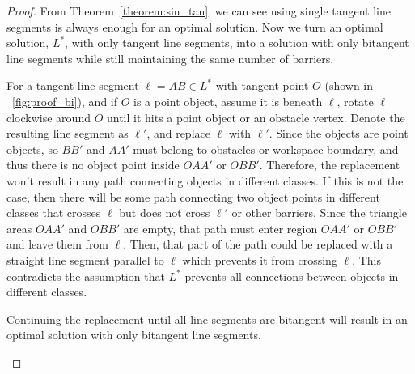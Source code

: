 \begin{proof}
From Theorem~\ref{theorem:sin_tan}, we can see using single tangent line segments is always enough
for an optimal solution. 
Now we turn an optimal solution, $L^*$, with only tangent line segments, into
a solution with only bitangent line segments while still maintaining the same number of barriers. 

For a tangent line segment $\ell=AB\in L^*$ with tangent point $O$ (shown in ~\ref{fig:proof_bi}), and if $O$ is a point object, assume it is beneath $\ell$,
rotate $\ell$ clockwise around $O$ until it hits a point object or an obstacle vertex.
Denote the resulting line segment as $\ell'$, and replace $\ell$ with $\ell'$.
Since the objects are point objects, so $BB'$ and $AA'$ must belong to obstacles or workspace boundary, 
and thus there is no object point inside $OAA'$ or $OBB'$. 
Therefore, the replacement won't result in
any path connecting objects in different classes.
If this is not the case, then there will be some path connecting two object points in different classes that crosses $\ell$ but does not cross $\ell'$ or other barriers. 
Since the triangle areas $OAA'$ and $OBB'$ are empty, that path must enter region $OAA'$ or $OBB'$ and leave them from $\ell$. Then, that part of the path could be replaced with a straight line segment parallel to $\ell$ which prevents it from crossing $\ell$. This contradicts the assumption that $L^*$ prevents all connections between objects in different classes. %

Continuing the replacement until all line segments are bitangent will result in an optimal solution with only bitangent line segments.

\begin{figure}[ht]
    \centering
{}
\end{figure}
\end{proof}
